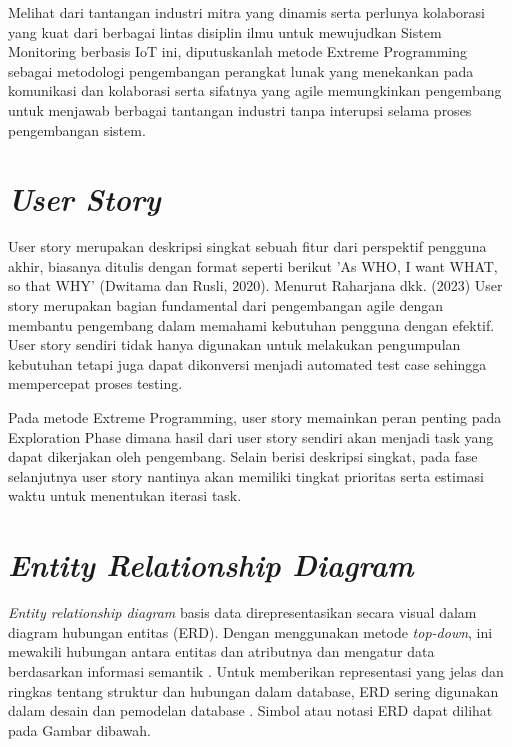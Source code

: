 Melihat dari tantangan industri mitra yang dinamis serta perlunya kolaborasi yang kuat dari berbagai lintas disiplin ilmu untuk mewujudkan Sistem Monitoring berbasis IoT ini, diputuskanlah metode Extreme Programming sebagai metodologi pengembangan perangkat lunak yang menekankan pada komunikasi dan kolaborasi serta sifatnya yang agile memungkinkan pengembang untuk menjawab berbagai tantangan industri tanpa interupsi selama proses pengembangan sistem.

\section{\textit{User Story}}

\noindent User story merupakan deskripsi singkat sebuah fitur dari perspektif pengguna akhir, biasanya ditulis dengan format seperti berikut 'As WHO, I want WHAT, so that WHY' (Dwitama dan Rusli, 2020).  Menurut Raharjana dkk. (2023) User story merupakan bagian fundamental dari pengembangan agile dengan membantu pengembang dalam memahami kebutuhan pengguna dengan efektif. User story sendiri tidak hanya digunakan untuk melakukan pengumpulan kebutuhan tetapi juga dapat dikonversi menjadi automated test case sehingga mempercepat proses testing.

Pada metode Extreme Programming, user story memainkan peran penting pada Exploration Phase dimana hasil dari user story sendiri akan menjadi task yang dapat dikerjakan oleh pengembang. Selain berisi deskripsi singkat, pada fase selanjutnya user story nantinya akan memiliki tingkat prioritas serta estimasi waktu untuk menentukan iterasi task.

\section{\textit{Entity Relationship Diagram}}

\noindent \textit{Entity relationship diagram} basis data direpresentasikan secara visual dalam diagram hubungan entitas (ERD). Dengan menggunakan metode \textit{top-down}, ini mewakili hubungan antara entitas dan atributnya dan mengatur data berdasarkan informasi semantik \parencite{article:chen}. Untuk memberikan representasi yang jelas dan ringkas tentang struktur dan hubungan dalam database, ERD sering digunakan dalam desain dan pemodelan database \parencite{article:supriyadi}. Simbol atau notasi ERD dapat dilihat pada Gambar dibawah.

